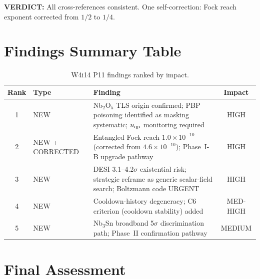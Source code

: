 \documentclass[11pt]{article}
\newcommand{\ee}[1]{\times 10^{#1}}
\newcommand{\verdict}[1]{\textcolor{green!50!black}{\textbf{VERDICT:} #1}}
\theoremstyle{definition}
\theoremstyle{remark}
\begin{document}
\verdict{All cross-references consistent. One self-correction:
Fock reach exponent corrected from $1/2$ to $1/4$.}


\section{Findings Summary Table}

\begin{table}[H]
\centering
\caption{W4i14 P11 findings ranked by impact.}
\label{tab:findings_summary}
\renewcommand{\arraystretch}{1.3}
\begin{tabular}{@{}clp{7cm}c@{}}
\toprule
\textbf{Rank} & \textbf{Type} & \textbf{Finding} & \textbf{Impact} \\
\midrule
1 & NEW & Nb$_2$O$_5$ TLS origin confirmed; PBP poisoning
  identified as masking systematic; $n_{\rm qp}$ monitoring
  required & HIGH \\
2 & NEW + CORRECTED & Entangled Fock reach $1.0\ee{-10}$
  (corrected from $4.6\ee{-10}$); Phase~I-B upgrade pathway &
  HIGH \\
3 & NEW & DESI 3.1--4.2$\sigma$ existential risk; strategic
  reframe as generic scalar-field search; Boltzmann code
  URGENT & HIGH \\
4 & NEW & Cooldown-history degeneracy; C6 criterion
  (cooldown stability) added & MED-HIGH \\
5 & NEW & Nb$_3$Sn broadband 5$\sigma$ discrimination path;
  Phase~II confirmation pathway & MEDIUM \\
\bottomrule
\end{tabular}
\end{table}


\section{Final Assessment}
\end{document}
